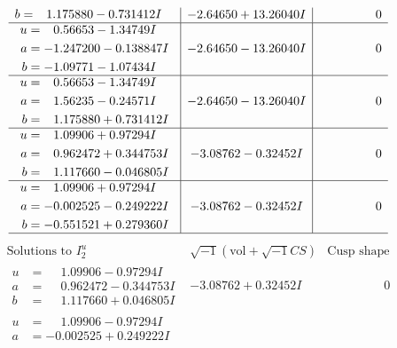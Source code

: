 \documentclass[1p]{elsarticle_modified}
\theoremstyle{definition}
\newcommand{\I}{\sqrt{-1}}
\begin{document}
$$\begin{array}{c|c|c}
\begin{aligned}
b &= \phantom{-}1.175880 - 0.731412 I\end{aligned}
 & -2.64650 + 13.26040 I & \phantom{-0.000000 } 0 \\ \hline\begin{aligned}
u &= \phantom{-}0.56653 - 1.34749 I \\
a &= -1.247200 - 0.138847 I \\
b &= -1.09771 - 1.07434 I\end{aligned}
 & -2.64650 - 13.26040 I & \phantom{-0.000000 } 0 \\ \hline\begin{aligned}
u &= \phantom{-}0.56653 - 1.34749 I \\
a &= \phantom{-}1.56235 - 0.24571 I \\
b &= \phantom{-}1.175880 + 0.731412 I\end{aligned}
 & -2.64650 - 13.26040 I & \phantom{-0.000000 } 0 \\ \hline\begin{aligned}
u &= \phantom{-}1.09906 + 0.97294 I \\
a &= \phantom{-}0.962472 + 0.344753 I \\
b &= \phantom{-}1.117660 - 0.046805 I\end{aligned}
 & -3.08762 - 0.32452 I & \phantom{-0.000000 } 0 \\ \hline\begin{aligned}
u &= \phantom{-}1.09906 + 0.97294 I \\
a &= -0.002525 - 0.249222 I \\
b &= -0.551521 + 0.279360 I\end{aligned}
 & -3.08762 - 0.32452 I & \phantom{-0.000000 } 0\\
 \hline 
 \end{array}$$\newpage$$\begin{array}{c|c|c}  
\text{Solutions to }I^u_{2}& \I (\text{vol} + \sqrt{-1}CS) & \text{Cusp shape}\\
 \hline 
\begin{aligned}
u &= \phantom{-}1.09906 - 0.97294 I \\
a &= \phantom{-}0.962472 - 0.344753 I \\
b &= \phantom{-}1.117660 + 0.046805 I\end{aligned}
 & -3.08762 + 0.32452 I & \phantom{-0.000000 } 0 \\ \hline\begin{aligned}
u &= \phantom{-}1.09906 - 0.97294 I \\
a &= -0.002525 + 0.249222 I \\

\end{aligned}
\end{array}$$
\end{document}
